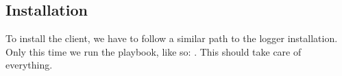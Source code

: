 \subsection{Installation}
To install the client, we have to follow a similar path to the logger installation. Only this time we run the  playbook, like so: . This should take care of everything.